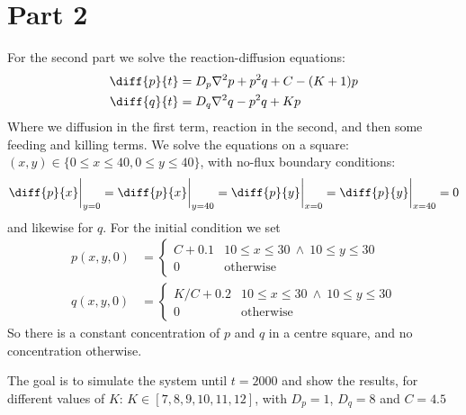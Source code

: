 \documentclass[a4paper,10pt]{article}
\begin{document}
	\section*{Part 2}
	For the second part we solve the reaction-diffusion equations:
	\begin{align}
		\diff{p}{t} &= D_p \nabla^2 p + p^2q+C-(K+1)p \\
		\diff{q}{t} &= D_q \nabla^2 q - p^2q+Kp
	\end{align}
	Where we diffusion in the first term, reaction in the second, and then some feeding and killing terms. We solve the equations on a square: $(x,y) \in \{0\leq x \leq 40, 0\leq y\leq 40\} $, with no-flux boundary conditions:
	\begin{equation}\label{key}
		\diff{p}{x}\bigg|_{y=0} = \diff{p}{x}\bigg|_{y=40} = \diff{p}{y}\bigg|_{x=0} = \diff{p}{y}\bigg|_{x=40} = 0
	\end{equation}
	and likewise for $ q $. For the initial condition we set
	\begin{align}\label{key}
		p(x,y,0) &= \begin{cases}
		C+0.1 & 10 \leq x \leq 30\  \wedge \ 10 \leq y \leq 30 \\
		0 & \text{otherwise}
		\end{cases} \\
		q(x,y,0) &= \begin{cases}
		K/C+0.2 & 10 \leq x \leq 30\  \wedge \ 10 \leq y \leq 30 \\
		0 & \text{otherwise}
		\end{cases}
	\end{align}
	So there is a constant concentration of $ p $ and $ q $ in a centre square, and no concentration otherwise.
	
	The goal is to simulate the system until $ t=2000 $ and show the results, for different values of $ K $: $ K \in [7,8,9,10,11,12] $, with $ D_p = 1 $, $ D_q=8 $ and $ C=4.5 $
	
\end{document}
